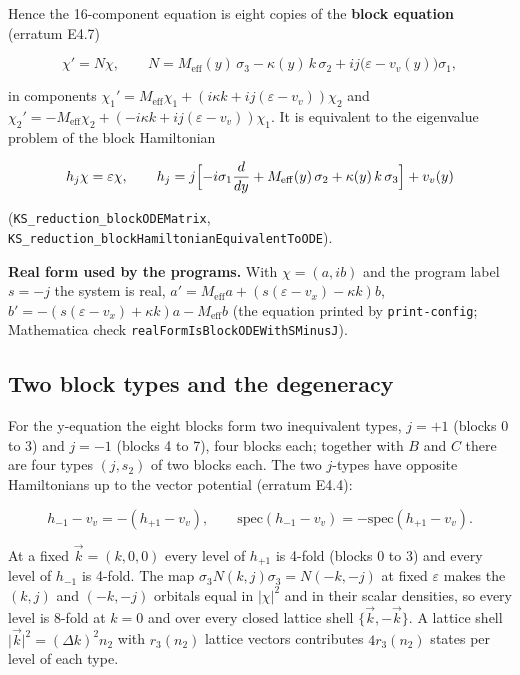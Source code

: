\documentclass[11pt]{article}
\begin{document}
Hence the 16-component equation is eight copies of the \textbf{block equation} (erratum E4.7)

\[
\chi'=N\chi,\qquad N=M_{\mathrm{eff}}(y)\,\sigma_3-\kappa(y)\,k\,\sigma_2+ij\bigl(\varepsilon-v_v(y)\bigr)\sigma_1 ,
\]

in components $\chi_1'=M_{\mathrm{eff}}\chi_1+(i\kappa k+ij(\varepsilon-v_v))\chi_2$ and $\chi_2'=-M_{\mathrm{eff}}\chi_2+(-i\kappa k+ij(\varepsilon-v_v))\chi_1$. It is equivalent to the eigenvalue problem of the block Hamiltonian

\[
h_j\chi=\varepsilon\chi,\qquad h_j=j\Bigl[-i\sigma_1\frac{d}{dy}+M_{\mathrm{eff}}(y)\,\sigma_2+\kappa(y)\,k\,\sigma_3\Bigr]+v_v(y)
\]

(\texttt{KS\_reduc\allowbreak{}tion\_blo\allowbreak{}ckODEMat\allowbreak{}rix}, \texttt{KS\_reduc\allowbreak{}tion\_blo\allowbreak{}ckHamilt\allowbreak{}onianEqu\allowbreak{}ivalentT\allowbreak{}oODE}).

\textbf{Real form used by the programs.} With $\chi=(a,ib)$ and the program label $s=-j$ the system is real, $a'=M_{\mathrm{eff}}a+(s(\varepsilon-v_x)-\kappa k)b$, $b'=-(s(\varepsilon-v_x)+\kappa k)a-M_{\mathrm{eff}}b$ (the equation printed by \texttt{print-co\allowbreak{}nfig}; Mathematica check \texttt{realForm\allowbreak{}IsBlockO\allowbreak{}DEWithSM\allowbreak{}inusJ}).

\subsection{Two block types and the degeneracy}

For the y-equation the eight blocks form two inequivalent types, $j=+1$ (blocks 0 to 3) and $j=-1$ (blocks 4 to 7), four blocks each; together with $B$ and $C$ there are four types $(j,s_2)$ of two blocks each. The two $j$-types have opposite Hamiltonians up to the vector potential (erratum E4.4):

\[
h_{-1}-v_v=-(h_{+1}-v_v),\qquad \mathrm{spec}(h_{-1}-v_v)=-\mathrm{spec}(h_{+1}-v_v).
\]

At a fixed $\vec k=(k,0,0)$ every level of $h_{+1}$ is 4-fold (blocks 0 to 3) and every level of $h_{-1}$ is 4-fold. The map $\sigma_3N(k,j)\sigma_3=N(-k,-j)$ at fixed $\varepsilon$ makes the $(k,j)$ and $(-k,-j)$ orbitals equal in $\lvert\chi\rvert^2$ and in their scalar densities, so every level is 8-fold at $k=0$ and over every closed lattice shell $\{\vec k,-\vec k\}$. A lattice shell $\lvert\vec k\rvert^2=(\Delta k)^2n_2$ with $r_3(n_2)$ lattice vectors contributes $4r_3(n_2)$ states per level of each type.
\end{document}
